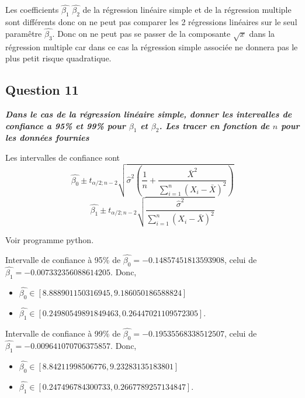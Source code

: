 \documentclass[pdflatex]{article}
\theoremstyle{definition}
\newcommand{\quest}[1]{\textbf{\textit{#1}} \vspace{3mm}}
\begin{document}

Les coefficients $\hat{\beta_1}$ $\hat{\beta_2}$ de la r\'egression lin\'eaire simple et de la r\'egression multiple sont diff\'erents donc on ne peut pas comparer les 2 r\'egressions lin\'eaires sur le seul param\^etre $\hat{\beta_3}$. Donc on ne peut pas se passer de la composante $\sqrt{x}$ dans la r\'egression multiple car dans ce cas la r\'egression simple associ\'ee ne donnera pas le plus petit risque quadratique.


\subsection*{Question 11}
\quest{Dans le cas de la r\'egression lin\'eaire simple, donner les intervalles de confiance a 95\% et 99\% pour $\beta_1$ et $\beta_2$. Les tracer en fonction de $n$ pour les donn\'ees fournies}

Les intervalles de confiance sont 
$$
\hat{\beta_0} \pm t_{\alpha/2;n-2}\sqrt{\hat{\sigma}^2\left(\frac{1}{n}+\frac{\bar{X}^2}{\sum_{i=1}^{n}{(X_i-\bar{X})^2}}\right)}
$$
$$
\hat{\beta_1} \pm t_{\alpha/2;n-2}\sqrt{\frac{\hat{\sigma}^2}{\sum_{i=1}^{n}{(X_i-\bar{X})^2}}}
$$

Voir programme python.

Intervalle de confiance \`a 95\% de $\hat{\beta_0} = -0.14857451813593908$, celui de $\hat{\beta_1} = -0.007332356088614205$. Donc, 
\begin{itemize}
    \item $ \hat{\beta_0} \in [8.888901150316945, 9.186050186588824]$ 
    \item $\hat{\beta_1} \in [0.24980549891849463, 0.26447021109572305]$.
\end{itemize}

\vspace{5mm}
Intervalle de confiance \`a 99\% de $\hat{\beta_0} = -0.19535568338512507$, celui de $\hat{\beta_1} = -0.009641070706375857$. Donc,
\begin{itemize}
    \item $\hat{\beta_0} \in [8.84211998506776, 9.23283135183801]$
    \item $\hat{\beta_1} \in [0.247496784300733, 0.2667789257134847]$.
\end{itemize}
\end{document}
